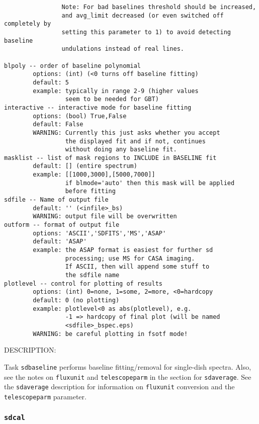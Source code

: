 \begin{verbatim}
                Note: For bad baselines threshold should be increased,
                and avg_limit decreased (or even switched off completely by
                setting this parameter to 1) to avoid detecting baseline
                undulations instead of real lines.

blpoly -- order of baseline polynomial
        options: (int) (<0 turns off baseline fitting)
        default: 5
        example: typically in range 2-9 (higher values
                 seem to be needed for GBT)
interactive -- interactive mode for baseline fitting
        options: (bool) True,False
        default: False
        WARNING: Currently this just asks whether you accept
                 the displayed fit and if not, continues
                 without doing any baseline fit.
masklist -- list of mask regions to INCLUDE in BASELINE fit
        default: [] (entire spectrum)
        example: [[1000,3000],[5000,7000]]
                 if blmode='auto' then this mask will be applied
                 before fitting
sdfile -- Name of output file
        default: '' (<infile>_bs)
        WARNING: output file will be overwritten
outform -- format of output file
        options: 'ASCII','SDFITS','MS','ASAP'
        default: 'ASAP'
        example: the ASAP format is easiest for further sd
                 processing; use MS for CASA imaging.
                 If ASCII, then will append some stuff to
                 the sdfile name
plotlevel -- control for plotting of results
        options: (int) 0=none, 1=some, 2=more, <0=hardcopy
        default: 0 (no plotting)
        example: plotlevel<0 as abs(plotlevel), e.g.
                 -1 => hardcopy of final plot (will be named
                 <sdfile>_bspec.eps)
        WARNING: be careful plotting in fsotf mode!
\end{verbatim}

    DESCRIPTION:

    Task {\tt sdbaseline} performs baseline fitting/removal for single-dish spectra.
    Also, see the notes on {\tt fluxunit} and {\tt telescopeparm} in the section for
    {\tt sdaverage}.
    See the {\tt sdaverage} description for information on {\tt fluxunit} 
    conversion and the {\tt telescopeparm} parameter.


\subsubsection{{\tt sdcal}}
\label{section:sd.sdtasks.tasks.sdcal}

